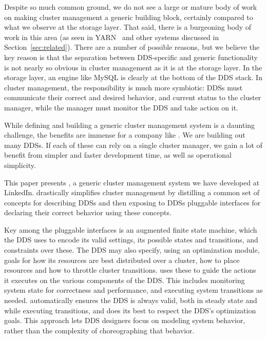 Despite so much common ground, we do not see a large or mature body of work on making cluster 
management a generic building block, certainly compared to what we observe at
the storage layer.  That said, there is a burgeoning body of work in this area
(as seen in YARN~\cite{yarn} and other systems discussed in
Section~\ref{sec:related}).  There are a number of possible reasons, but we
believe the key reason is that the separation between DDS-specific and generic
functionality is not nearly so obvious in cluster management as it is at the
storage layer.  In the storage layer, an engine like MySQL is clearly at the
bottom of the DDS stack.  In cluster management, the responsibility is much more
symbiotic: DDSs must communicate their correct and desired behavior, and current status to the cluster 
manager, while the manager must monitor the DDS and take action on it.

While defining and building a generic cluster management system is a daunting
challenge, the benefits are immense for a company like \linkedin.  We are
building out many DDSs.  If each of these can rely on a single cluster manager,
we gain a lot of benefit from simpler and faster development time, as well as
operational simplicity.  

\textbf{\helix} This paper presents \helix, a generic cluster management system we have developed at LinkedIn.  
\helix drastically simplifies cluster management by distilling a common
set of concepts for describing DDSs and then exposing to DDSs pluggable
interfaces for declaring their correct behavior using these concepts.  


Key among the pluggable interfaces is
an augmented finite state machine, which the DDS uses
to encode its valid settings, \ie its possible states and
transitions, and constraints over these.   The 
DDS may also specify, using an optimization module, goals for how its resources are best distributed over a cluster, \ie
how to place resources and how to throttle cluster transitions.  
\helix uses these to guide the actions it executes on the various
components of the DDS.  This includes monitoring 
system state for correctness and performance, and executing system transitions as
needed.  \helix automatically ensures the DDS is always valid, both in steady state and while
executing transitions, and does its best to respect the DDS's optimization
goals.  This approach lets DDS
designers focus on modeling system behavior, rather than the complexity of choreographing 
that behavior.

